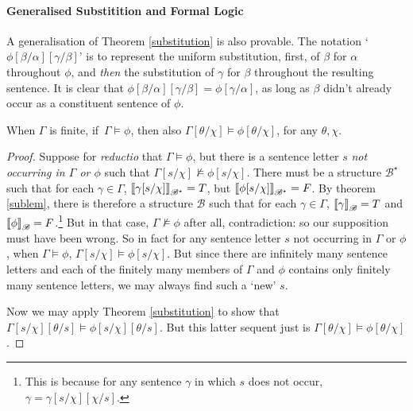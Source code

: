 \paragraph{Generalised Substitition and Formal Logic} A generalisation of Theorem \ref{substitution} is also provable. The notation ‘$\phi[\beta/\alpha][\gamma/\beta]$’ is to represent the uniform substitution, first, of $\beta$ for $\alpha$ throughout $\phi$, and \emph{then} the substitution of $\gamma$ for $\beta$ throughout the resulting sentence. It is clear that $\phi[\beta/\alpha][\gamma/\beta] = \phi[\gamma/\alpha]$, as long as $\beta$ didn't already occur as a constituent sentence of $
\phi$. \begin{theorem}\label{generalsub}
	When $\Gamma$ is finite, if\, $\Gamma \vDash \phi$, then also $\Gamma[\theta/\chi] \vDash \phi[\theta/\chi]$, for any $\theta, \chi$. \begin{proof}
		Suppose for \emph{reductio} that $\Gamma \vDash \phi$, but there is a sentence letter $s$ \emph{not occurring in $\Gamma$ or $\phi$} such that $\Gamma[s/\chi] \nvDash\phi[s/\chi]$. There must be a structure $\mathscr{B^{\star}}$ such that for each $\gamma \in \Gamma$, $\left\llbracket \gamma[s/\chi]\right\rrbracket_{\mathscr{B^{\star}}}=T$, but $\left\llbracket \phi[s/\chi]\right\rrbracket_{\mathscr{B^{\star}}}=F$.
		By theorem \ref{sublem}, there is therefore a structure $\mathscr{B}$ such that for each $\gamma \in \Gamma$, $\left\llbracket \gamma\right\rrbracket_{\mathscr{B}}=T$ and $\left\llbracket \phi\right\rrbracket_{\mathscr{B}}=F$.\footnote{This is because for any sentence $\gamma$ in which $s$ does not occur, $\gamma = \gamma[s/\chi][\chi/s]$.} But in that case, $\Gamma \nvDash \phi$ after all, contradiction: so our supposition must have been wrong. So in fact for any sentence letter $s$ not occurring in $\Gamma$ or $\phi$, when $\Gamma \vDash \phi$, $\Gamma[s/\chi] \vDash \phi[s/\chi]$. 
But since there are infinitely many sentence letters and each of the finitely many members of $\Gamma$ and $\phi$ contains only finitely many sentence letters, we may always find such a `new' $s$.  

	Now we may apply Theorem \ref{substitution} to show that $\Gamma[s/\chi][\theta/s] \vDash \phi[s/\chi][\theta/s]$. But this latter sequent just is $\Gamma[\theta/\chi] \vDash \phi[\theta/\chi]$.
	\end{proof}
\end{theorem}
